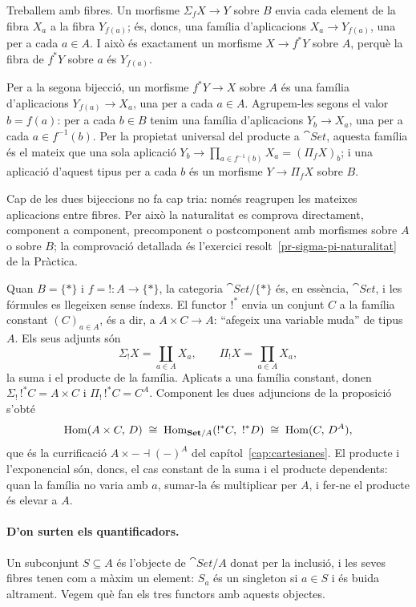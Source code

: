 \begin{prova}
Treballem amb fibres. Un morfisme $\Sigma_f X\to Y$ sobre $B$ envia cada element de la fibra $X_a$ a la fibra $Y_{f(a)}$; és, doncs, una família d'aplicacions $X_a\to Y_{f(a)}$, una per a cada $a\in A$. I això és exactament un morfisme $X\to f^{*}Y$ sobre $A$, perquè la fibra de $f^{*}Y$ sobre $a$ és $Y_{f(a)}$.

Per a la segona bijecció, un morfisme $f^{*}Y\to X$ sobre $A$ és una família d'aplicacions $Y_{f(a)}\to X_a$, una per a cada $a\in A$. Agrupem-les segons el valor $b=f(a)$: per a cada $b\in B$ tenim una família d'aplicacions $Y_b\to X_a$, una per a cada $a\in f^{-1}(b)$. Per la propietat universal del producte a $\cat{Set}$, aquesta família és el mateix que una sola aplicació $Y_b\to\prod_{a\in f^{-1}(b)}X_a=(\Pi_f X)_b$; i una aplicació d'aquest tipus per a cada $b$ és un morfisme $Y\to\Pi_f X$ sobre $B$.

Cap de les dues bijeccions no fa cap tria: només reagrupen les mateixes aplicacions entre fibres. Per això la naturalitat es comprova directament, component a component, precomponent o postcomponent amb morfismes sobre $A$ o sobre $B$; la comprovació detallada és l'exercici resolt~\ref{pr-sigma-pi-naturalitat} de la Pràctica.
\end{prova}

Quan $B=\{\ast\}$ i $f=!\colon A\to\{\ast\}$, la categoria $\cat{Set}/\{\ast\}$ és, en essència, $\cat{Set}$, i les fórmules es llegeixen sense índexs. El functor $!^{*}$ envia un conjunt $C$ a la família constant $(C)_{a\in A}$, és a dir, a $A\times C\to A$: \enquote{afegeix una variable muda} de tipus $A$. Els seus adjunts són
\[
\Sigma_!X=\coprod_{a\in A}X_a,
\qquad
\Pi_!X=\prod_{a\in A}X_a,
\]
la suma i el producte de la família. Aplicats a una família constant, donen $\Sigma_!\,!^{*}C=A\times C$ i $\Pi_!\,!^{*}C=C^{A}$. Component les dues adjuncions de la proposició s'obté
\[
\Hom(A\times C,\,D)\;\cong\;\Hom_{\cat{Set}/A}(!^{*}C,\ !^{*}D)\;\cong\;\Hom(C,\,D^{A}),
\]
que és la currificació $A\times-\dashv(-)^{A}$ del capítol~\ref{cap:cartesianes}. El producte i l'exponencial són, doncs, el cas constant de la suma i el producte dependents: quan la família no varia amb $a$, sumar-la és multiplicar per $A$, i fer-ne el producte és elevar a $A$.

\paragraph{D'on surten els quantificadors.} Un subconjunt $S\subseteq A$ és l'objecte de $\cat{Set}/A$ donat per la inclusió, i les seves fibres tenen com a màxim un element: $S_a$ és un singleton si $a\in S$ i és buida altrament. Vegem què fan els tres functors amb aquests objectes.

